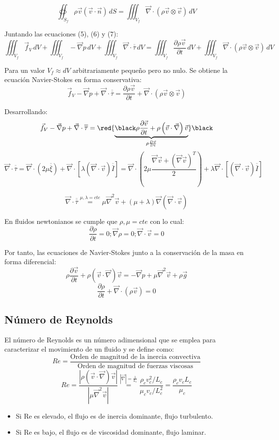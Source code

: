 \begin{equation}
\oiint_{S_f}\rho\vec{v}\left(\vec{v}\cdot\vec{n}\right)\,dS
=
\iiint_{V_f}\vec{\nabla}\cdot\left(\rho \vec{ v} \otimes \vec{v}\right)\,dV
\end{equation}

Juntando las ecuaciones (5), (6) y (7):
\[\iiint_{V_f}\vec{f}_V\,dV
+
\iiint_{V_f}-\vec{\nabla}p\,dV
+
\iiint_{V_f}\vec{\nabla}\cdot\overline{\overline{\tau}}\,dV
=
\iiint_{V_f}\frac{\partial \rho\vec{v}}{\partial t}\,dV
+
\iiint_{V_f}\vec{\nabla}\cdot\left(\rho \vec{ v} \otimes \vec{v}\right)\,dV
\]

Para un valor $V_f \approx dV$ arbitrariamente pequeño pero no nulo. Se obtiene la ecuación Navier-Stokes en forma conservativa:
\[
\vec{f}_V
-
\vec{\nabla}p
+
\vec{\nabla}\cdot\overline{\overline{\tau}}
=
\frac{\partial \rho\vec{v}}{\partial t}
+
\vec{\nabla}\cdot\left(\rho \vec{ v} \otimes \vec{v}\right)
\]

Desarrollando:
\[\vec{f}_V
-
\vec{\nabla}p
+
\vec{\nabla}\cdot\overline{\overline{\tau}}
=
\red{\underbrace{\black \rho\frac{\partial\vec{v}}{\partial t}
+
\rho \left(\vec{v}\cdot\vec{\nabla}\right)\vec{v}}_{\rho\frac{D\vec{v}}{Dt}}}\black\]
\[\vec{\nabla}\cdot\overline{\overline{\tau}}
=
\vec{\nabla}\cdot\left(2\mu\overline{\overline{\xi}}\right)
+
\vec{\nabla}\cdot\left[\lambda\left(\vec{\nabla}\cdot\vec{v}\right)\overline{\overline{I}}\right]
=
\vec{\nabla}\cdot\left(2\mu\frac{\vec{\nabla}\vec{v}+\left(\vec{\nabla}\vec{v}\right)^T}{2}\right)
+
\lambda\vec{\nabla}\cdot\left[\left(\vec{\nabla}\cdot\vec{v}\right)\overline{\overline{I}}\right]
\]

\[\vec{\nabla}\cdot\overline{\overline{\tau}}
	\stackrel{\mu,\lambda=cte}{=}
	\mu\vec{\nabla}^2\vec{v}+\left(\mu+\lambda\right)\vec{\nabla}\left(\vec{\nabla}\cdot\vec{v}\right)
	\]
	
En fluidos newtonianos se cumple que $\rho,\mu=cte$ con lo cual:
\[\frac{\partial \rho}{\partial t}=0; \vec{\nabla}\rho=0; \vec{\nabla}\cdot\vec{v}=0\]

Por tanto, las ecuaciones de Navier-Stokes junto a la conservación de la masa en forma diferencial:
\[\rho\frac{\partial \vec{v}}{\partial t}+\rho\left(\vec{v}\cdot\vec{\nabla}\right)\vec{v}=-\vec{\nabla}p+\mu\vec{\nabla}^2\vec{v}+\rho \vec{g}\]
\[\frac{\partial \rho}{\partial t} +\vec{\nabla}\cdot\left(\rho\vec{v}\right)=0\]
\subsection{Número de Reynolds}
El número de Reynolds es un número adimensional que se emplea para caracterizar el movimiento de un fluido y se define como:
\[Re=\frac{\text{Orden de magnitud de la inercia convectiva}}{\text{Orden de magnitud de fuerzas viscosas}}\]
\[Re=\frac{|\rho\left(\vec{v}\cdot\vec{\nabla}\right)\vec{v}|}{|\mu\vec{\nabla}^2\vec{v}|}
\stackrel{|\vec{\nabla}|=\frac{1}{L_c}}{=}\frac{\rho_c v^2_c/L_c}{\mu_c v_c/L^2_c}=\frac{\rho_c v_c L_c}{\mu_c}\]
\begin{itemize}
	\item Si Re es elevado, el flujo es de inercia dominante, flujo turbulento.
	\item Si Re es bajo, el flujo es de viscosidad dominante, flujo laminar.
\end{itemize}
